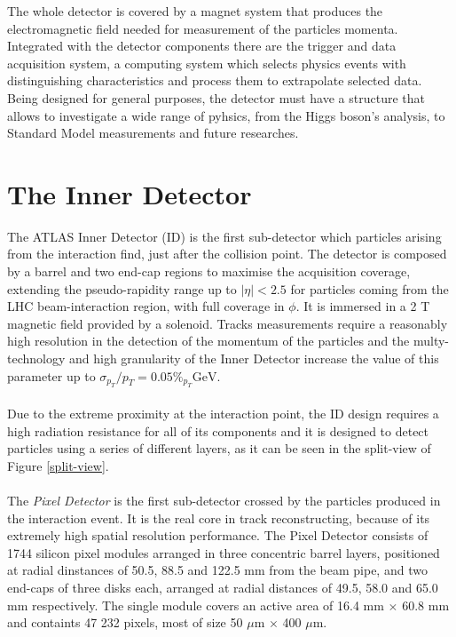 The whole detector is covered by a magnet system that produces the electromagnetic field needed for measurement of the particles momenta.
\\
Integrated with the detector components there are the trigger and data acquisition system, a computing system which selects physics events with distinguishing characteristics and process them to extrapolate selected data.
\\
Being designed for general purposes, the detector must have a structure that allows to investigate a wide range of pyhsics, from the Higgs boson's analysis, to Standard Model measurements and future researches.

\section{The Inner Detector}
The ATLAS Inner Detector (ID)\cite{Aad:2010bx} is the first sub-detector which particles arising from the interaction find, just after the collision point. The detector is composed by a barrel and two end-cap regions to maximise the acquisition coverage, extending the pseudo-rapidity range up to $|\eta| < 2.5$ for particles coming from the LHC beam-interaction region, with full coverage in $\phi$. It is immersed in a 2 T magnetic field provided by a solenoid. Tracks measurements require a reasonably high resolution in the detection of the momentum of the particles and the multy-technology and high granularity of the Inner Detector increase the value of this parameter up to $\sigma_{p_T} / p_T = 0.05\%_{p_T} \text{GeV}$.
\\\\
Due to the extreme proximity at the interaction point, the ID design requires a high radiation resistance for all of its components and it is designed to detect particles using a series of different layers, as it can be seen in the split-view of Figure \ref{split-view}.
\\\\
\phantom{1}\hspace{0.3cm}The \emph{Pixel Detector} is the first sub-detector crossed by the particles produced in the interaction event. It is the real core in track reconstructing, because of its extremely high spatial resolution performance. The Pixel Detector consists of 1744 silicon pixel modules\cite{Aad_2008} arranged in three concentric barrel layers, positioned at radial dinstances of 50.5, 88.5 and 122.5 mm from the beam pipe, and two end-caps of three disks each, arranged at radial distances of 49.5, 58.0 and 65.0 mm respectively. The single module covers an active area of 16.4 mm $\times$ 60.8 mm and containts 47 232 pixels, most of size 50 $\mu$m $\times$ 400 $\mu$m.
